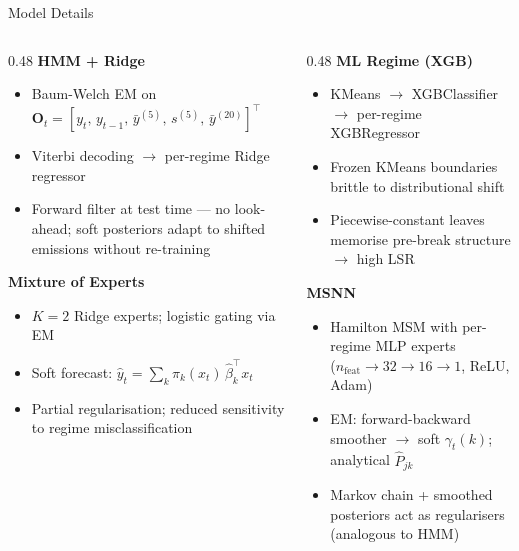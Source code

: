 \documentclass[aspectratio=169, 10pt]{beamer}
\begin{document}
\begin{frame}{Model Details}

  \begin{columns}[T]
    \begin{column}{0.48\textwidth}
      \textbf{HMM + Ridge}
      \begin{itemize}\setlength\itemsep{2pt}
        \item Baum-Welch EM on $\mathbf{O}_t = [y_t,\, y_{t-1},\, \bar{y}^{(5)},\, s^{(5)},\, \bar{y}^{(20)}]^\top$
        \item Viterbi decoding $\to$ per-regime Ridge regressor
        \item Forward filter at test time — no look-ahead; soft posteriors adapt to shifted emissions without re-training
      \end{itemize}

      \vspace{4pt}
      \textbf{Mixture of Experts}
      \begin{itemize}\setlength\itemsep{2pt}
        \item $K{=}2$ Ridge experts; logistic gating via EM
        \item Soft forecast: $\hat{y}_t = \sum_k \pi_k(x_t)\,\hat\beta_k^\top x_t$
        \item Partial regularisation; reduced sensitivity to regime misclassification
      \end{itemize}
    \end{column}
    \begin{column}{0.48\textwidth}
      \textbf{ML Regime (XGB)}
      \begin{itemize}\setlength\itemsep{2pt}
        \item KMeans $\to$ XGBClassifier $\to$ per-regime XGBRegressor
        \item Frozen KMeans boundaries brittle to distributional shift
        \item Piecewise-constant leaves memorise pre-break structure $\to$ high LSR
      \end{itemize}

      \vspace{4pt}
      \textbf{MSNN}
      \begin{itemize}\setlength\itemsep{2pt}
        \item Hamilton MSM with per-regime MLP experts\\($n_\text{feat}\!\to\!32\!\to\!16\!\to\!1$, ReLU, Adam)
        \item EM: forward-backward smoother $\to$ soft $\gamma_t(k)$; analytical $\hat{P}_{jk}$
        \item Markov chain + smoothed posteriors act as regularisers (analogous to HMM)
      \end{itemize}
    \end{column}
  \end{columns}

\end{frame}
\end{document}
